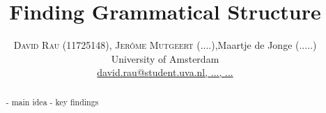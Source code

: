 \documentclass[twoside]{article}
\title{\vspace{-15mm}\fontsize{24pt}{10pt}\selectfont\textbf{Finding Grammatical Structure}} %
\author{
\large
\textsc{David Rau (11725148), Jer\^ome Mutgeert (....)},Maartje de Jonge (.....) \\[2mm] %
\normalsize University of Amsterdam \\ %
\normalsize \href{mailto:david.rau@student.uva.nl, ...,...}{david.rau@student.uva.nl, ..., ...} %
\vspace{-5mm}
}
\date{}
\begin{document}
\maketitle %

\thispagestyle{fancy} %


\begin{abstract}

\noindent 
- main idea
- key findings

\end{abstract}

\end{document}
